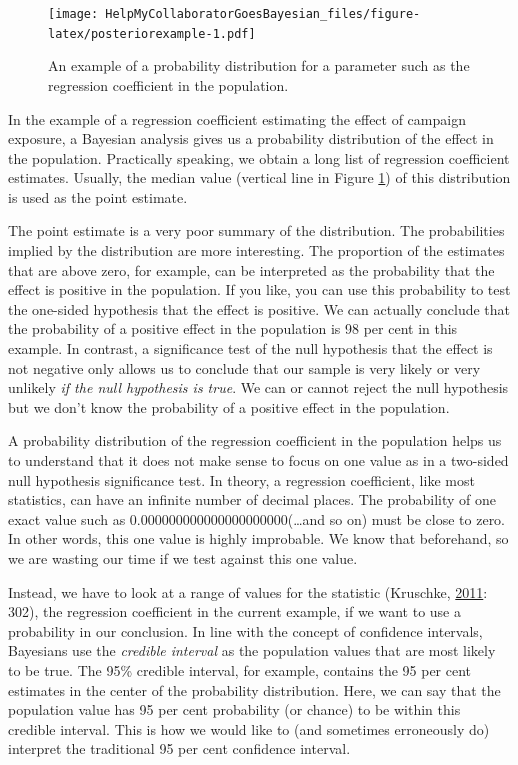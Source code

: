 \documentclass[doc]{apa6}
\begin{document}
\begin{figure}
\centering
\texttt{[image: HelpMyCollaboratorGoesBayesian\_files/figure-latex/posteriorexample-1.pdf]}
\caption{\label{fig:posteriorexample}An example of a probability
distribution for a parameter such as the regression coefficient in the
population.}
\end{figure}

In the example of a regression coefficient estimating the effect of
campaign exposure, a Bayesian analysis gives us a probability
distribution of the effect in the population. Practically speaking, we
obtain a long list of regression coefficient estimates. Usually, the
median value (vertical line in Figure \ref{fig:posteriorexample}) of
this distribution is used as the point estimate.

The point estimate is a very poor summary of the distribution. The
probabilities implied by the distribution are more interesting. The
proportion of the estimates that are above zero, for example, can be
interpreted as the probability that the effect is positive in the
population. If you like, you can use this probability to test the
one-sided hypothesis that the effect is positive. We can actually
conclude that the probability of a positive effect in the population is
98 per cent in this example. In contrast, a significance test of the
null hypothesis that the effect is not negative only allows us to
conclude that our sample is very likely or very unlikely \emph{if the
null hypothesis is true}. We can or cannot reject the null hypothesis
but we don't know the probability of a positive effect in the
population.

A probability distribution of the regression coefficient in the
population helps us to understand that it does not make sense to focus
on one value as in a two-sided null hypothesis significance test. In
theory, a regression coefficient, like most statistics, can have an
infinite number of decimal places. The probability of one exact value
such as 0.000000000000000000000(\ldots{}and so on) must be close to
zero. In other words, this one value is highly improbable. We know that
beforehand, so we are wasting our time if we test against this one
value.

Instead, we have to look at a range of values for the statistic
(Kruschke,
\protect\hyperlink{ref-kruschkeBayesianAssessmentNull2011}{2011}: 302),
the regression coefficient in the current example, if we want to use a
probability in our conclusion. In line with the concept of confidence
intervals, Bayesians use the \emph{credible interval} as the population
values that are most likely to be true. The 95\% credible interval, for
example, contains the 95 per cent estimates in the center of the
probability distribution. Here, we can say that the population value has
95 per cent probability (or chance) to be within this credible interval.
This is how we would like to (and sometimes erroneously do) interpret
the traditional 95 per cent confidence interval.
\end{document}
